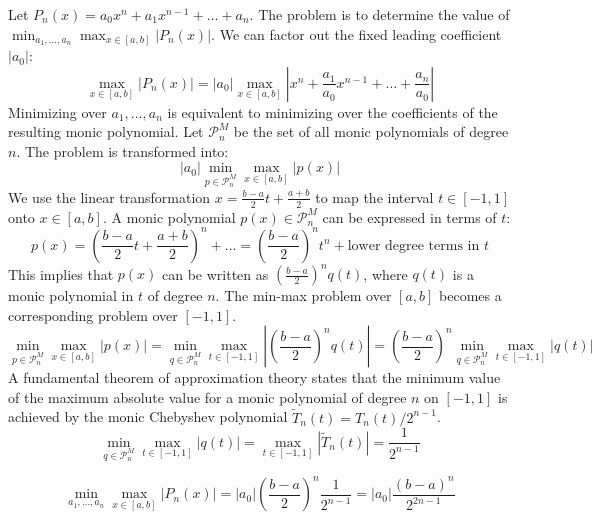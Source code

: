 \documentclass[a4paper]{article}
\begin{document}
Let $P_n(x) = a_0x^n + a_1x^{n-1} + \dots + a_n$. The problem is to determine the value of $\min_{a_1, \dots, a_n} \max_{x \in [a,b]} |P_n(x)|$.
We can factor out the fixed leading coefficient $|a_0|$:
\[
\max_{x \in [a,b]} |P_n(x)| = |a_0| \max_{x \in [a,b]} |x^n + \frac{a_1}{a_0}x^{n-1} + \dots + \frac{a_n}{a_0}|
\]
Minimizing over $a_1, \dots, a_n$ is equivalent to minimizing over the coefficients of the resulting monic polynomial. Let $\mathcal{P}_n^M$ be the set of all monic polynomials of degree $n$. The problem is transformed into:
\[
|a_0| \min_{p \in \mathcal{P}_n^M} \max_{x \in [a,b]} |p(x)|
\]
We use the linear transformation $x = \frac{b-a}{2}t + \frac{a+b}{2}$ to map the interval $t \in [-1, 1]$ onto $x \in [a,b]$.
A monic polynomial $p(x) \in \mathcal{P}_n^M$ can be expressed in terms of $t$:
\[
p(x) = \left(\frac{b-a}{2}t + \frac{a+b}{2}\right)^n + \dots = \left(\frac{b-a}{2}\right)^n t^n + \text{lower degree terms in } t
\]
This implies that $p(x)$ can be written as $(\frac{b-a}{2})^n q(t)$, where $q(t)$ is a monic polynomial in $t$ of degree $n$.
The min-max problem over $[a,b]$ becomes a corresponding problem over $[-1,1]$.
\[
\min_{p \in \mathcal{P}_n^M} \max_{x \in [a,b]} |p(x)| = \min_{q \in \mathcal{P}_n^M} \max_{t \in [-1,1]} \left|\left(\frac{b-a}{2}\right)^n q(t)\right| = \left(\frac{b-a}{2}\right)^n \min_{q \in \mathcal{P}_n^M} \max_{t \in [-1,1]} |q(t)|
\]
A fundamental theorem of approximation theory states that the minimum value of the maximum absolute value for a monic polynomial of degree $n$ on $[-1,1]$ is achieved by the monic Chebyshev polynomial $\tilde{T}_n(t) = T_n(t)/2^{n-1}$.
\[
\min_{q \in \mathcal{P}_n^M} \max_{t \in [-1,1]} |q(t)| = \max_{t \in [-1,1]} |\tilde{T}_n(t)| = \frac{1}{2^{n-1}}
\]

\[
\min_{a_1, \dots, a_n} \max_{x \in [a,b]} |P_n(x)| = |a_0| \left(\frac{b-a}{2}\right)^n \frac{1}{2^{n-1}} = |a_0| \frac{(b-a)^n}{2^{2n-1}}
\]
\end{document}
